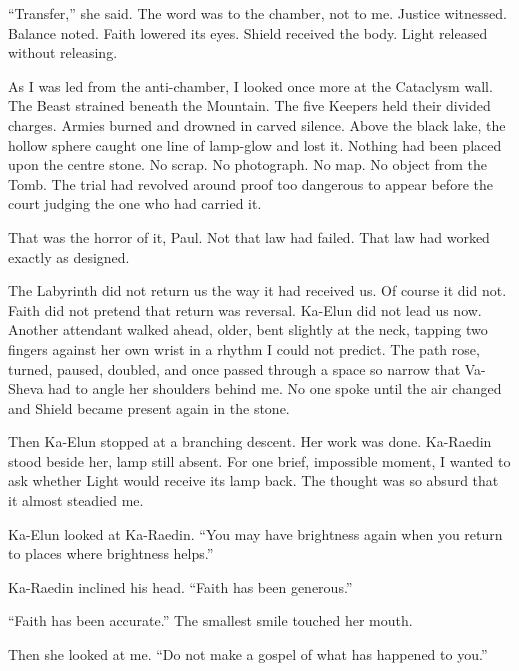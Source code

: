 ``Transfer,'' she said. The word was to the chamber, not to me. Justice witnessed. Balance noted. Faith lowered its eyes. Shield received the body. Light released without releasing.\par

As I was led from the anti-chamber, I looked once more at the Cataclysm wall. The Beast strained beneath the Mountain. The five Keepers held their divided charges. Armies burned and drowned in carved silence. Above the black lake, the hollow sphere caught one line of lamp-glow and lost it. Nothing had been placed upon the centre stone. No scrap. No photograph. No map. No object from the Tomb. The trial had revolved around proof too dangerous to appear before the court judging the one who had carried it.\par

That was the horror of it, Paul. Not that law had failed. That law had worked exactly as designed.\par

The Labyrinth did not return us the way it had received us. Of course it did not. Faith did not pretend that return was reversal. Ka-Elun did not lead us now. Another attendant walked ahead, older, bent slightly at the neck, tapping two fingers against her own wrist in a rhythm I could not predict. The path rose, turned, paused, doubled, and once passed through a space so narrow that Va-Sheva had to angle her shoulders behind me. No one spoke until the air changed and Shield became present again in the stone.\par

Then Ka-Elun stopped at a branching descent. Her work was done. Ka-Raedin stood beside her, lamp still absent. For one brief, impossible moment, I wanted to ask whether Light would receive its lamp back. The thought was so absurd that it almost steadied me.\par

Ka-Elun looked at Ka-Raedin. ``You may have brightness again when you return to places where brightness helps.''\par

Ka-Raedin inclined his head. ``Faith has been generous.''\par

``Faith has been accurate.'' The smallest smile touched her mouth.\par

Then she looked at me. ``Do not make a gospel of what has happened to you.''\par

